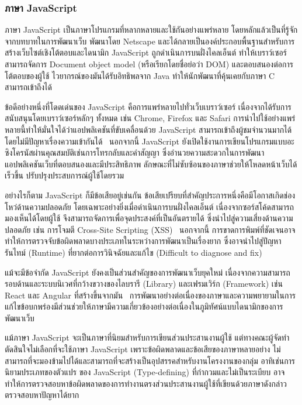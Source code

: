 \documentclass[12pt,one side,openright,a4paper]{cpe-thesis-th}
\newcommand{\thaijustify}[1]{%
  \par\hspace{30pt}\justifying
  #1
}
\begin{document}
        \subsubsection{ภาษา JavaScript}
            \thaijustify{
                ภาษา JavaScript เป็นภาษาโปรแกรมที่หลากหลายและใช้กันอย่างแพร่หลาย โดยหลักแล้วเป็นที่รู้จักจากบทบาทในการพัฒนาเว็บ พัฒนาโดย Netscape และได้กลายเป็นองค์ประกอบพื้นฐานสำหรับการสร้างเว็บไซต์เชิงโต้ตอบและไดนามิก JavaScript ถูกดำเนินการบนฝั่งไคลเอ็นต์ ทำให้เบราว์เซอร์สามารถจัดการ Document object model (หรือเรียกโดยชื่อย่อว่า DOM) และตอบสนองต่อการโต้ตอบของผู้ใช้ ไวยากรณ์ของมันได้รับอิทธิพลจาก Java ทำให้นักพัฒนาที่คุ้นเคยกับภาษา C สามารถเข้าถึงได้~\cite{flanagan20js}
            }
            \thaijustify{
                ข้อดีอย่างหนึ่งที่โดดเด่นของ JavaScript คือการแพร่หลายไปทั่วเว็บเบราว์เซอร์ เนื่องจากได้รับการสนับสนุนโดยเบราว์เซอร์หลักๆ ทั้งหมด เช่น Chrome, Firefox และ Safari การนำไปใช้อย่างแพร่หลายนี้ทำให้มั่นใจได้ว่าแอปพลิเคชันที่ขับเคลื่อนด้วย JavaScript สามารถเข้าถึงผู้ชมจำนวนมากได้โดยไม่มีปัญหาเรื่องความเข้ากันได้~\cite{flanagan20js} นอกจากนี้ JavaScript ยังเปิดใช้งานการเขียนโปรแกรมแบบอะซิงโครนัสผ่านคุณสมบัติเช่นการโทรกลับและคำสัญญา ซึ่งอำนวยความสะดวกในการพัฒนาแอปพลิเคชันเว็บที่ตอบสนองและมีประสิทธิภาพ ลักษณะที่ไม่ซับซ้อนของภาษาช่วยให้โหลดหน้าเว็บได้เร็วขึ้น ปรับปรุงประสบการณ์ผู้ใช้โดยรวม~\cite{crockford08js}
            }
            \thaijustify{
                อย่างไรก็ตาม JavaScript ก็มีข้อเสียอยู่เช่นกัน ข้อเสียเปรียบที่สำคัญประการหนึ่งคือมีโอกาสเกิดช่องโหว่ด้านความปลอดภัย โดยเฉพาะอย่างยิ่งเมื่อดำเนินการบนฝั่งไคลเอ็นต์ เนื่องจากซอร์สโค้ดสามารถมองเห็นได้โดยผู้ใช้ จึงสามารถจัดการเพื่อจุดประสงค์ที่เป็นอันตรายได้ ซึ่งนำไปสู่ความเสี่ยงด้านความปลอดภัย เช่น การโจมตี Cross-Site Scripting (XSS)~\cite{flanagan20js} นอกจากนี้ การขาดการพิมพ์ที่ชัดเจนอาจทำให้การตรวจจับข้อผิดพลาดบางประเภทในระหว่างการพัฒนาเป็นเรื่องยาก ซึ่งอาจนำไปสู่ปัญหารันไทม์ (Runtime) ที่ยากต่อการวินิจฉัยและแก้ไข (Difficult to diagnose and fix)~\cite{crockford08js}
            }
            \thaijustify{
                แม้จะมีข้อจำกัด JavaScript ยังคงเป็นส่วนสำคัญของการพัฒนาเว็บยุคใหม่ เนื่องจากความสามารถรอบด้านและระบบนิเวศที่กว้างขวางของไลบรารี (Library) และเฟรมเวิร์ก (Framework) เช่น React และ Angular ที่สร้างขึ้นจากมัน~\cite{flanagan20js} การพัฒนาอย่างต่อเนื่องของภาษาและความพยายามในการแก้ไขข้อบกพร่องมีส่วนช่วยให้ภาษามีความเกี่ยวข้องอย่างต่อเนื่องในภูมิทัศน์แบบไดนามิกของการพัฒนาเว็บ~\cite{crockford08js}
            }
            \thaijustify{
                แม้ภาษา JavaScript จะเป็นภาษาที่นิยมสำหรับการเขียนส่วนประสานงานผู้ใช้ แต่ทางคณะผู้จัดทำตัดสินใจไม่เลือกที่จะใช้ภาษา JavaScript เพราะข้อผิดพลาดและข้อเสียของภาษาหลายอย่าง ไม่สามารถที่จะมองข้ามไปได้และสามารถที่จะสร้างเป็นอุปสรรคสำหรับงานโครงงานของกลุ่ม อาทิเช่นการนิยามประเภทของตัวแปร ของ JavaScript (Type-defining) ที่กำกวมและไม่เป็นระเบียบ อาจทำให้การตรวจสอบหาข้อผิดพลาดของการทำงานตรงส่วนประสานงานผู้ใช้ที่เขียนด้วยภาษาดังกล่าว ตรวจสอบหาปัญหาได้ยาก
            }
\end{document}
